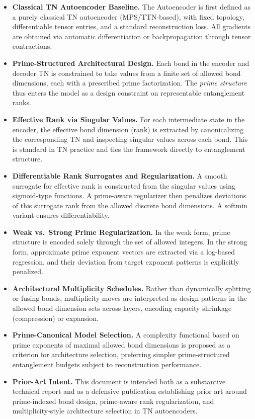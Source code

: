 \documentclass[11pt]{article}
\begin{document}
\begin{itemize}[leftmargin=1.5em]
    \item \textbf{Classical TN Autoencoder Baseline.} The Autoencoder is first defined as a purely classical TN autoencoder (MPS/TTN-based), with fixed topology, differentiable tensor entries, and a standard reconstruction loss. All gradients are obtained via automatic differentiation or backpropagation through tensor contractions.

    \item \textbf{Prime-Structured Architectural Design.} Each bond in the encoder and decoder TN is constrained to take values from a finite set of allowed bond dimensions, each with a prescribed prime factorization. The \emph{prime structure} thus enters the model as a design constraint on representable entanglement ranks.

    \item \textbf{Effective Rank via Singular Values.} For each intermediate state in the encoder, the effective bond dimension (rank) is extracted by canonicalizing the corresponding TN and inspecting singular values across each bond. This is standard in TN practice and ties the framework directly to entanglement structure.

    \item \textbf{Differentiable Rank Surrogates and Regularization.} A smooth surrogate for effective rank is constructed from the singular values using sigmoid-type functions. A prime-aware regularizer then penalizes deviations of this surrogate rank from the allowed discrete bond dimensions. A softmin variant ensures differentiability.

    \item \textbf{Weak vs.\ Strong Prime Regularization.} In the weak form, prime structure is encoded solely through the set of allowed integers. In the strong form, approximate prime exponent vectors are extracted via a log-based regression, and their deviation from target exponent patterns is explicitly penalized.

    \item \textbf{Architectural Multiplicity Schedules.} Rather than dynamically splitting or fusing bonds, multiplicity moves are interpreted as design patterns in the allowed bond dimension sets across layers, encoding capacity shrinkage (compression) or expansion.

    \item \textbf{Prime-Canonical Model Selection.} A complexity functional based on prime exponents of maximal allowed bond dimensions is proposed as a criterion for architecture selection, preferring simpler prime-structured entanglement budgets subject to reconstruction performance.

    \item \textbf{Prior-Art Intent.} This document is intended both as a substantive technical report and as a defensive publication establishing prior art around prime-indexed bond design, prime-aware rank regularization, and multiplicity-style architecture selection in TN autoencoders.
\end{itemize}
\end{document}
